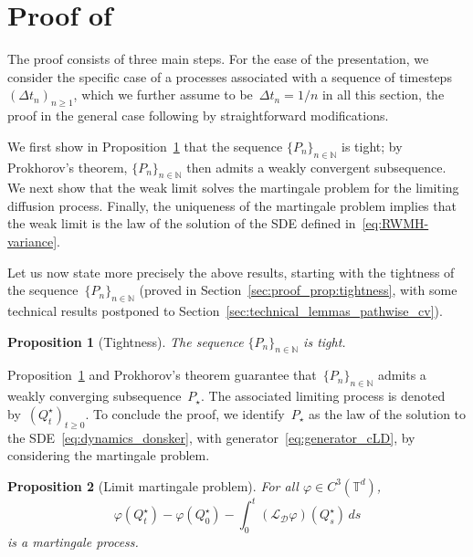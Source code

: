 \documentclass{article}
\newtheorem{proposition}{Proposition}
\newcommand{\cL}{\mathcal{L}}
\renewcommand{\geq}{\geqslant}
\def\N{\mathbb{N}}
\def\T{\mathbb{T}}
\newcommand{\Diff}{\mathcal{D}}
\renewcommand{\dim}{d}
\newcommand{\cLD}{\cL_\Diff}
\begin{document}
\section{Proof of~}
\label{app:thm:Donsker}

The proof consists of three main steps. For the ease of the presentation, we consider the specific case of a processes associated with a sequence of timesteps~$(\Delta t_n)_{n \geq 1}$, which we further assume to be~$\Delta t_n = 1/n$ in all this section, the proof in the general case following by straightforward modifications.

We first show in Proposition~\ref{prop:tightness} that the sequence $\{P_n\}_{n\in\mathbb{N}}$ is tight; by Prokhorov's theorem, $\{P_n\}_{n\in\mathbb{N}}$ then admits a weakly convergent subsequence. We next show that the weak limit solves the martingale problem for the limiting diffusion process. Finally, the uniqueness of the martingale problem implies that the weak limit is the law of the solution of the SDE defined in~\eqref{eq:RWMH-variance}. 

Let us now state more precisely the above results, starting with the tightness of the sequence~$\{P_n\}_{n\in\N}$ (proved in Section~\ref{sec:proof_prop:tightness}, with some technical results postponed to Section~\ref{sec:technical_lemmas_pathwise_cv}).

\begin{proposition}[Tightness]
  \label{prop:tightness}
  The sequence $\{P_n\}_{n\in\N}$ is tight.
\end{proposition}

Proposition~\ref{prop:tightness} and Prokhorov's theorem guarantee that~$\{P_n\}_{n\in\N}$ admits a weakly converging subsequence~$P_\star$. The associated limiting process is denoted by~$(Q^\star_t)_{t\geq 0}$. To conclude the proof, we identify~$P_\star$ as the law of the solution to the SDE~\eqref{eq:dynamics_donsker}, with generator~\eqref{eq:generator_cLD}, by considering the martingale problem.

\begin{proposition}[Limit martingale problem]
  \label{prop:limit-martingale}
  For all $\varphi\in C^3(\T^\dim)$,
  \[
  \varphi(Q^\star_t) - \varphi(Q^\star_0) - \int_{0}^t (\cLD\varphi)(Q^\star_s) \, ds
  \]
  is a martingale process.
\end{proposition}
\end{document}

